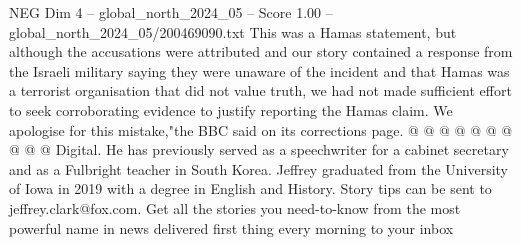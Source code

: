 \begin{textsample}{NEG Dim 4 – global\_north\_2024\_05 – Score 1.00 – global\_north\_2024\_05/200469090.txt}
This was a Hamas statement, but although the accusations were attributed and our story contained a response from the Israeli military saying they were unaware of the incident and that Hamas was a terrorist organisation that did not value truth, we had not made sufficient effort to seek corroborating evidence to justify reporting the Hamas claim.
We apologise for this mistake,"the BBC said on its corrections page. @ @ @ @ @ @ @ @ @ @ Digital.
He has previously served as a speechwriter for a cabinet secretary and as a Fulbright teacher in South Korea.
Jeffrey graduated from the University of Iowa in 2019 with a degree in English and History.
Story tips can be sent to jeffrey.clark@fox.com.
Get all the stories you need-to-know from the most powerful name in news delivered first thing every morning to your inbox

\end{textsample}
